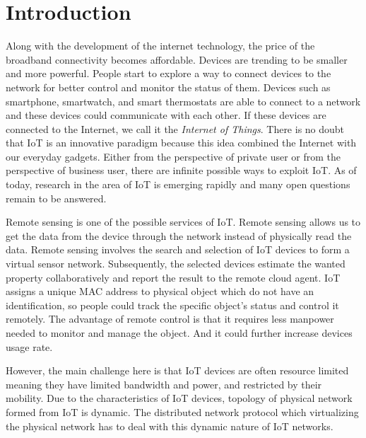 \documentclass[12pt,journal]{IEEEtran}
\begin{document}
\section{Introduction}
% 
% 
% 
% 
\IEEEPARstart
{A}{long} with the development of the internet technology, the price of the broadband connectivity becomes affordable. Devices are trending to be  smaller and more powerful. People start to explore a way to connect devices to the network for better control and monitor the status of them. Devices such as smartphone, smartwatch, and smart thermostats are able to connect to a network and these devices could communicate with each other. If these devices are connected to the Internet, we call it the \textit{Internet of Things}. There is no doubt that IoT is an innovative paradigm \cite{Atzori} because this idea combined the Internet with our everyday gadgets. Either from the perspective of private user or from the perspective of business user, there are infinite possible ways to exploit IoT. As of today, research in the area of IoT is emerging rapidly and many open questions remain to be answered.

Remote sensing is one of the possible services of IoT. Remote sensing allows us to get the data from the device through the network instead of physically read the data. Remote sensing involves the search and selection of IoT devices to form a virtual sensor network. Subsequently, the selected devices estimate the wanted property collaboratively and report the result to the remote cloud agent. IoT assigns a unique MAC address to physical object which do not have an identification, so people could track the specific object’s status and control it remotely. The advantage of remote control is that it requires less manpower needed to monitor and manage the object. And it could further increase devices usage rate.

However, the main challenge here is that IoT devices are often resource limited meaning they have limited bandwidth and power, and restricted by their mobility. Due to the characteristics of IoT devices, topology of physical network formed from IoT is dynamic. The distributed network protocol which virtualizing the physical network has to deal with this dynamic nature of IoT networks.
\end{document}
